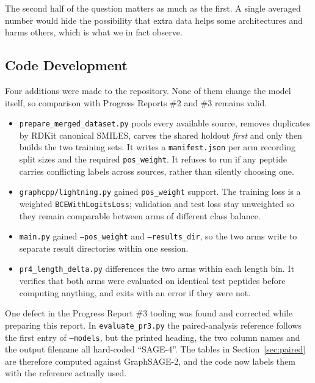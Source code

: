 \documentclass[11pt,a4paper]{article}
\newcommand{\code}[1]{\texttt{\small #1}}
\begin{document}
The second half of the question matters as much as the first. A single averaged number would hide the
possibility that extra data helps some architectures and harms others, which is what we in fact observe.

\subsection{Code Development}
Four additions were made to the repository. None of them change the model itself, so comparison with
Progress Reports \#2 and \#3 remains valid.

\begin{itemize}
  \sloppy %
  \item \code{prepare\_merged\_dataset.py} pools every available source, removes duplicates by RDKit
  canonical SMILES, carves the shared holdout \emph{first} and only then builds the two training sets.
  It writes a \code{manifest.json} per arm recording split sizes and the required \code{pos\_weight}.
  It refuses to run if any peptide carries conflicting labels across sources, rather than silently
  choosing one.
  \item \code{graphcpp/lightning.py} gained \code{pos\_weight} support. The training loss is a weighted
  \code{BCEWith\-Logits\-Loss}; validation and test loss stay unweighted so they remain comparable between
  arms of different class balance.
  \item \code{main.py} gained \code{--pos\_weight} and \code{--results\_dir}, so the two arms write to
  separate result directories within one session.
  \item \code{pr4\_length\_delta.py} differences the two arms within each length bin. It verifies that
  both arms were evaluated on identical test peptides before computing anything, and exits with an error
  if they were not.
\end{itemize}

One defect in the Progress Report \#3 tooling was found and corrected while preparing this report. In
\code{evaluate\_pr3.py} the paired-analysis reference follows the first entry of \code{--models}, but the
printed heading, the two column names and the output filename all hard-coded ``SAGE-4''. The tables in
Section~\ref{sec:paired} are therefore computed against GraphSAGE-2, and the code now labels them with
the reference actually used.
\end{document}
